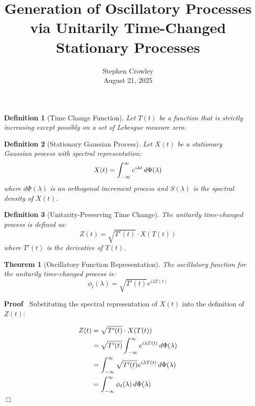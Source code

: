 \documentclass{article}
\newcommand{\tmaffiliation}[1]{\\ #1}
\newenvironment{proof}{\noindent\textbf{Proof\ }}{\hspace*{\fill}$\Box$\medskip}
\newtheorem{definition}{Definition}
\newtheorem{theorem}{Theorem}
\begin{document}
\title{Generation of Oscillatory Processes via Unitarily Time-Changed
Stationary Processes}

\author{
  Stephen Crowley
  \tmaffiliation{August 21, 2025}
}

\date{}

\maketitle

\begin{definition}
  [Time Change Function] Let $T (t)$ be a function that is strictly increasing
  except possibly on a set of Lebesgue measure zero.
\end{definition}

\begin{definition}
  [Stationary Gaussian Process] Let $X (t)$ be a stationary Gaussian process
  with spectral representation:
  \begin{equation}
    X (t) = \int_{- \infty}^{\infty} e^{i \lambda t}  \hspace{0.17em} d \Phi
    (\lambda)
  \end{equation}
  where $d \Phi (\lambda)$ is an orthogonal increment process and $S
  (\lambda)$ is the spectral density of $X (t)$.
\end{definition}

\begin{definition}
  [Unitarity-Preserving Time Change] The unitarily time-changed process is
  defined as:
  \begin{equation}
    Z (t) = \sqrt{T' (t)} \cdot X (T (t))
  \end{equation}
  where $T' (t)$ is the derivative of $T (t)$.
\end{definition}

\begin{theorem}
  [Oscillatory Function Representation] The oscillatory function for the
  unitarily time-changed process is:
  \begin{equation}
    \phi_t (\lambda) = \sqrt{T' (t)} e^{i \lambda T (t)}
  \end{equation}
\end{theorem}

\begin{proof}
  Substituting the spectral representation of $X (t)$ into the definition of
  $Z (t)$:
  
  \begin{align}
    Z (t) & = \sqrt{T' (t)} \cdot X (T (t)) \\
    & = \sqrt{T' (t)}  \int_{- \infty}^{\infty} e^{i \lambda T (t)} 
    \hspace{0.17em} d \Phi (\lambda) \\
    & = \int_{- \infty}^{\infty} \sqrt{T' (t)} e^{i \lambda T (t)} 
    \hspace{0.17em} d \Phi (\lambda) \\
    & = \int_{- \infty}^{\infty} \phi_t (\lambda)  \hspace{0.17em} d \Phi
    (\lambda) 
  \end{align}
\end{proof}
\end{document}
